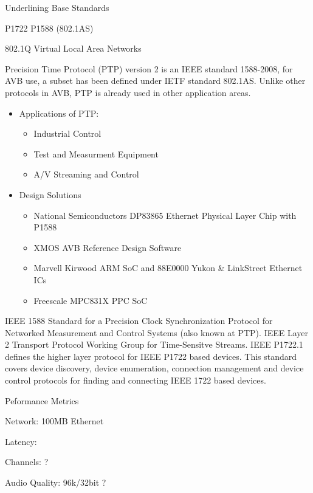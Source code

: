 { Underlining Base Standards }

	\item P1722
	\time P1588 (802.1AS)

802.1Q Virtual Local Area Networks


{ Precision Time Protocol (PTP) version 2 is an IEEE standard 1588-2008,
for AVB use, a subset has been defined under IETF standard 802.1AS.
Unlike other protocols in AVB, PTP is already used in other application areas.}
\begin{itemize}

	\item Applications of PTP:
	\begin{itemize}
		\item Industrial Control
		\item Test and Measurment Equipment
		\item A/V Streaming and Control
	\end{itemize}
\end{itemize}

\begin{itemize}
	\item Design Solutions
	\begin{itemize}
		\item National Semiconductors DP83865 Ethernet Physical Layer Chip with P1588 
		\item XMOS AVB Reference Design Software
		\item Marvell Kirwood ARM SoC and 88E0000 Yukon \& LinkStreet Ethernet ICs
		\item Freescale MPC831X PPC SoC
	\end{itemize}
\end{itemize}

{ IEEE 1588 Standard for a Precision Clock Synchronization Protocol for Networked Measurement and Control Systems (also known at PTP). }
{ IEEE Layer 2 Transport Protocol Working Group for Time-Sensitve Streams. }
{ IEEE P1722.1 defines the higher layer protocol for IEEE P1722 based devices.
This standard covers device discovery, device enumeration, connection management
and device control protocols for finding and connecting IEEE 1722 based devices. }

{ Peformance Metrics }
\item Network: 100MB Ethernet
\item Latency: 
\item Channels: ?
\item Audio Quality: 96k/32bit ?
